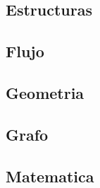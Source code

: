 \documentclass[10pt]{article}
\begin{document}
	\subsection{Estructuras}
		\subsection{Flujo}
		\subsection{Geometria}
		\subsection{Grafo}
		\subsection{Matematica}

	
	
	
\end{document}

